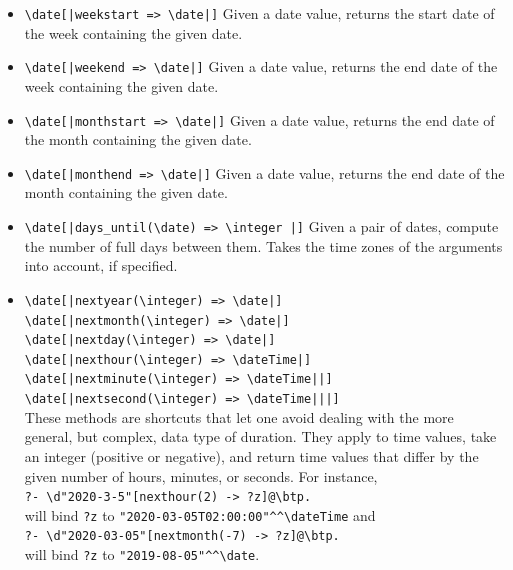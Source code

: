 \documentclass[11pt]{article}
\newcommand{\bs}{\textbackslash}
\begin{document}
\begin{itemize}
\item \texttt{\bs{}date[|weekstart => \bs{}date|]}
  Given a date value, returns the start date of the week containing
  the given date.
\item \texttt{\bs{}date[|weekend => \bs{}date|]}
  Given a date value, returns the end date of the week containing
  the given date.
\item \texttt{\bs{}date[|monthstart => \bs{}date|]}
  Given a date value, returns the end date of the month containing
  the given date.
\item \texttt{\bs{}date[|monthend => \bs{}date|]}
  Given a date value, returns the end date of the month containing
  the given date.
\item \texttt{\bs{}date[|days\_until(\bs{}date) => \bs{}integer |]}
  Given a pair of dates, compute the number of full days between them.
  Takes the time zones of the arguments into account, if specified.
\item {\tt \bs{}date[|nextyear(\bs{}integer) => \bs{}date|]}  
  \\
{\tt \bs{}date[|nextmonth(\bs{}integer) => \bs{}date|]}  
  \\
{\tt \bs{}date[|nextday(\bs{}integer) => \bs{}date|]}  
  \\
{\tt \bs{}date[|nexthour(\bs{}integer) => \bs{}dateTime|]}  
  \\
  \texttt{\bs{}date[|nextminute(\bs{}integer) => \bs{}dateTime||]}
  \\
  \texttt{\bs{}date[|nextsecond(\bs{}integer) => \bs{}dateTime|||]}
  \\
  These methods are shortcuts that let one avoid dealing with the more
  general, but complex, data type of duration.
  They apply to time values, take an integer (positive or negative), and return time
  values that differ by the given number of hours, minutes, or seconds.
  For instance,
  \\
  \hspace*{1cm}\verb|?- \d"2020-3-5"[nexthour(2) -> ?z]@\btp.|
  \\
  will bind \texttt{?z} to \verb|"2020-03-05T02:00:00"^^\dateTime| and 
  \\
  \hspace*{1cm}\verb|?- \d"2020-03-05"[nextmonth(-7) -> ?z]@\btp.|
  \\
  will bind \texttt{?z} to  \verb|"2019-08-05"^^\date|.
\end{itemize}
\end{document}
